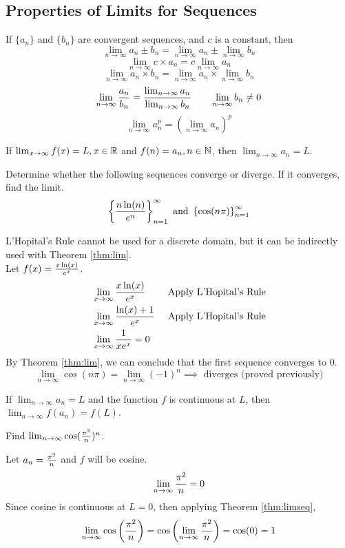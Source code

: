 \documentclass[english, 12pt]{article}
\begin{document}
\subsection{Properties of Limits for Sequences}
If $\{a_{n}\}$ and $\{b_{n}\}$ are convergent sequences, and $c$ is a constant, then
\[ \lim_{n \to \infty} a_{n} \pm b_{n} = \lim_{n \to \infty} a_{n} \pm \lim_{n \to \infty} b_{n} \]
\[ \lim_{n \to \infty} c \times a_{n} = c \lim_{n \to \infty} a_{n}\]
\[\lim_{n \to \infty} a_{n} \times  b_{n} = \lim_{n \to \infty} a_{n} \times \lim_{n \to \infty} b_{n} \]
\[ \lim_{n \to \infty} \frac{a_{n}}{b_{n}} = \frac{\lim_{n \to \infty} a_{n}}{\lim_{n \to \infty} b_{n}} \qquad \lim_{n \to \infty} b_{n} \neq 0 \]
\[\lim_{n \to \infty} a_{n}^p = (\lim_{n \to \infty} a_{n})^p \]
\begin{thrm}\label{thm:lim}
If $\lim_{x \to \infty} f(x) = L, x \in {\mathbb{R}}$ and $f(n) = a_{n}, n \in {\mathbb{N}}$, then $\lim_{n \to \infty} a_{n} = L$.
\end{thrm}
\begin{exmp}
Determine whether the following sequences converge or diverge. If it converges, find the limit.
\[\left\{\frac{n \ln(n)}{e^n}\right\}_{n=1}^\infty \text{ and } \left\{\cos(n \pi)\right\}_{n=1}^\infty\]
\begin{sol}
L'Hopital's Rule cannot be used for a discrete domain, but it can be indirectly used with Theorem \ref{thm:lim}.\\
Let $f(x)=\frac{x \ln(x)}{e^x}$.
\begin{align*}
&\lim_{x\to\infty}\frac{x \ln(x)}{e^x}&\text{ Apply L'Hopital's Rule}\\
&\lim_{x\to\infty}\frac{\ln(x) + 1}{e^x}&\text{ Apply L'Hopital's Rule}\\
&\lim_{x\to\infty}\frac{1}{x e^x} = 0\\
\end{align*}
By Theorem \ref{thm:lim}, we can conclude that the first sequence converges to $0$.
\[\lim_{n\to\infty} \cos(n \pi) = \lim_{n \to \infty} (-1)^n \implies \text{ diverges (proved previously)}\]
\end{sol}
\end{exmp}
\begin{thrm}\label{thm:limseq}
If $\lim_{n\to\infty} a_{n} = L$ and the function $f$ is continuous at $L$, then $\lim_{n\to\infty} f(a_{n}) = f(L)$.
\end{thrm}
\begin{exmp}
Find $\lim_{n\to\infty} \cos(\frac{\pi^2}{n})^n$.
\begin{sol}
Let $a_{n} = \frac{\pi^2}{n}$ and $f$ will be cosine.
\[\lim_{n\to\infty} \frac{\pi^2}{n} = 0 \]
Since cosine is continuous at $L=0$, then applying Theorem \ref{thm:limseq}, 
\[\lim_{n\to\infty} \cos\left(\frac{\pi^2}{n}\right) = \cos\left(\lim_{n\to\infty}\frac{\pi^2}{n}\right) = \cos(0) = 1 \]
\end{sol}
\end{exmp}
\end{document}
